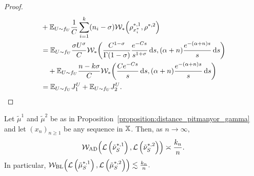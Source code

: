 \begin{proof}
\begin{align*}
        & +\mathbb{E}_{U \sim f_U}\frac{1}{C}\sum_{i = 1}^{k} (n_i - \sigma)\mathcal{W}_*\!\left(\rho_{x_i^*}^{*,1} , \rho^{*,2} \right) \\
        & =  \mathbb{E}_{U \sim f_U} \frac{\sigma U^\sigma}{C}\mathcal{W}_*\!\left(\frac{C^{1-\sigma}}{\Gamma(1-\sigma)}\frac{e^{-Cs}}{s^{1+\sigma}}\,\mathrm{d}s,
                (\alpha + n)\frac{e^{-(\alpha + n)s}}{s}\,\mathrm{d}s\right) \\
        & \quad +  \mathbb{E}_{U \sim f_U} \frac{n-k\sigma}{C}\mathcal{W}_*\!\left( \frac{Ce^{-Cs}}{s}\,\mathrm{d}s, (\alpha + n)\frac{e^{-(\alpha + n)s}}{s}\,\mathrm{d}s\right) \\
        & = \mathbb{E}_{U \sim f_U} J_1^U + \mathbb{E}_{U \sim f_U} J_2^U.
    \end{align*}
\end{proof}

\begin{theorem}\label{theorem:merging_pitmanyor_gamma}
    Let $\tilde{\mu}^1$ and $\tilde{\mu}^2$ be as in Proposition~\ref{proposition:distance_pitmanyor_gamma} and let $(x_n)_{n\geq 1}$ be any sequence in $\mathbb{X}$.
    Then, as $n \to \infty,$
    \[
    \mathcal{W}_{\mathrm{AD}}\!\left( \mathcal{L}\left(\tilde{\nu}^{*,1}_{S}\right),  \mathcal{L}\left(\tilde{\nu}^{*,2}_{S}\right) \right) \asymp \frac{k_n}{n}.
    \]
    In particular, $\mathcal{W}_{\mathrm{BL}}\!\left( \mathcal{L}\left(\tilde{\mu}^{*,1}_{S}\right), \mathcal{L}\left(\tilde{\mu}^{*,2}_{S}\right) \right)\lesssim \frac{k_n}{n}.$

\end{theorem}
